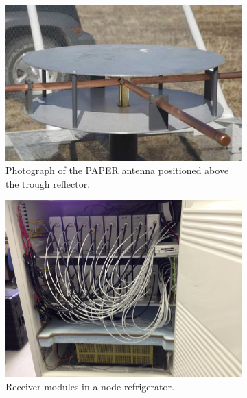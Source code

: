 \documentclass[preprint]{aastex}
\begin{document}
\begin{figure}[h]
	\centering
	\begin{subfigure}[b]{0.3\textwidth}
		\includegraphics[width=\textwidth]{plots/new_antenna_closeup.jpg}
		\caption{Photograph of the PAPER antenna positioned above the trough reflector.}
		\label{fig:element}
	\end{subfigure}
	\quad
	\begin{subfigure}[b]{0.3\textwidth}
		\includegraphics[width=\textwidth]{plots/recv_node.png}
		\caption{Receiver modules in a node refrigerator.}
		\label{fig:recv_node} 
	\end{subfigure}
	\quad
	\begin{subfigure}[b]{0.3\textwidth}

\end{subfigure}
\end{figure}
\end{document}
